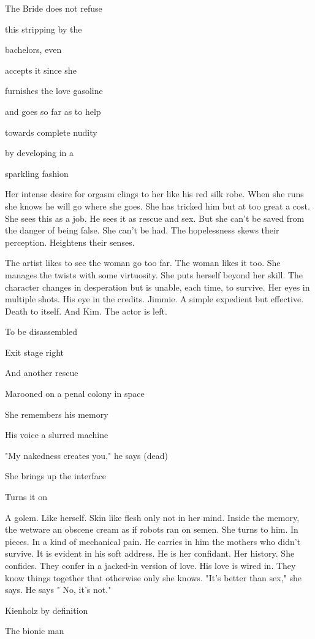 The Bride does not refuse

this stripping by the

bachelors, even

accepts it since she

furnishes the love gasoline

and goes so far as to help

towards complete nudity

by developing in a

sparkling fashion

Her intense desire for orgasm clings to her like his red silk robe. When
she runs she knows he will go where she goes. She has tricked him but at
too great a cost. She sees this as a job. He sees it as rescue and sex.
But she can't be saved from the danger of being false. She can't be had.
The hopelessness skews their perception. Heightens their senses.

The artist likes to see the woman go too far. The woman likes it too.
She manages the twists with some virtuosity. She puts herself beyond her
skill. The character changes in desperation but is unable, each time, to
survive. Her eyes in multiple shots. His eye in the credits. Jimmie. A
simple expedient but effective. Death to itself. And Kim. The actor is
left.

To be disassembled

Exit stage right

And another rescue

Marooned on a penal colony in space

She remembers his memory

His voice a slurred machine

"My nakedness creates you," he says (dead)

She brings up the interface

Turns it on

A golem. Like herself. Skin like flesh only not in her mind. Inside the
memory, the wetware an obscene cream as if robots ran on semen. She
turns to him. In pieces. In a kind of mechanical pain. He carries in him
the mothers who didn't survive. It is evident in his soft address. He is
her confidant. Her history. She confides. They confer in a jacked-in
version of love. His love is wired in. They know things together that
otherwise only she knows. "It's better than sex," she says. He says "
No, it's not."

Kienholz by definition

The bionic man

